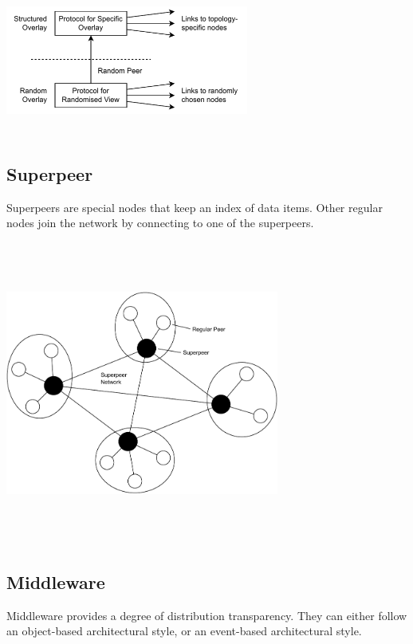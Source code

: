 \documentclass{article}
\begin{document}
\begin{center}
	\includegraphics[width=8cm, height=5cm, keepaspectratio]{assets/unstructured.pdf}
\end{center}

\subsection{Superpeer}
Superpeers are special nodes that keep an index of data items. Other regular nodes join the network by connecting to one of the superpeers.

\begin{center}
	\includegraphics[width=9cm, height=10cm, keepaspectratio]{assets/superpeer.pdf}
\end{center}

\subsection{Middleware}
Middleware provides a degree of distribution transparency. They can either follow an object-based architectural style, or an event-based architectural style.
\end{document}
